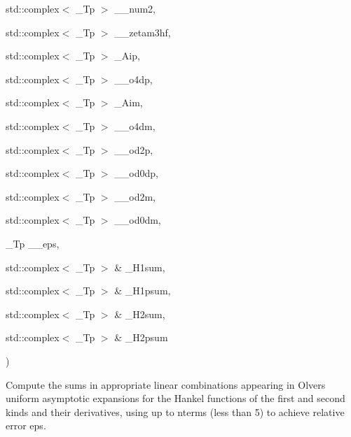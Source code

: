 {\begin{DoxyParamCaption}
\item[{std\+::complex$<$ \+\_\+\+Tp $>$}]{\+\_\+\+\_\+num2, }
\item[{std\+::complex$<$ \+\_\+\+Tp $>$}]{\+\_\+\+\_\+zetam3hf, }
\item[{std\+::complex$<$ \+\_\+\+Tp $>$}]{\+\_\+\+Aip, }
\item[{std\+::complex$<$ \+\_\+\+Tp $>$}]{\+\_\+\+\_\+o4dp, }
\item[{std\+::complex$<$ \+\_\+\+Tp $>$}]{\+\_\+\+Aim, }
\item[{std\+::complex$<$ \+\_\+\+Tp $>$}]{\+\_\+\+\_\+o4dm, }
\item[{std\+::complex$<$ \+\_\+\+Tp $>$}]{\+\_\+\+\_\+od2p, }
\item[{std\+::complex$<$ \+\_\+\+Tp $>$}]{\+\_\+\+\_\+od0dp, }
\item[{std\+::complex$<$ \+\_\+\+Tp $>$}]{\+\_\+\+\_\+od2m, }
\item[{std\+::complex$<$ \+\_\+\+Tp $>$}]{\+\_\+\+\_\+od0dm, }
\item[{\+\_\+\+Tp}]{\+\_\+\+\_\+eps, }
\item[{std\+::complex$<$ \+\_\+\+Tp $>$ \&}]{\+\_\+\+H1sum, }
\item[{std\+::complex$<$ \+\_\+\+Tp $>$ \&}]{\+\_\+\+H1psum, }
\item[{std\+::complex$<$ \+\_\+\+Tp $>$ \&}]{\+\_\+\+H2sum, }
\item[{std\+::complex$<$ \+\_\+\+Tp $>$ \&}]{\+\_\+\+H2psum}
\end{DoxyParamCaption}
)}\hypertarget{namespacestd_1_1____detail_a561dc02bc44b2dba376d6047289563c7}{}\label{namespacestd_1_1____detail_a561dc02bc44b2dba376d6047289563c7}


Compute the sums in appropriate linear combinations appearing in Olver\textquotesingle{}s uniform asymptotic expansions for the Hankel functions of the first and second kinds and their derivatives, using up to nterms (less than 5) to achieve relative error {\ttfamily eps}. 


